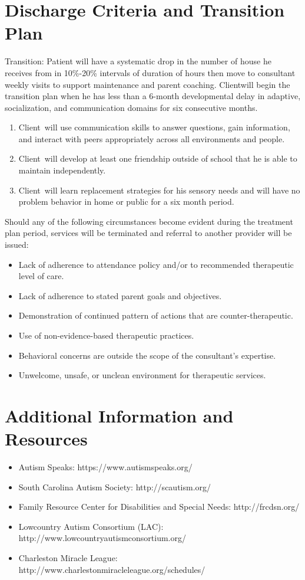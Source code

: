 \documentclass{article}
\def\clientfirstname{Client}
\begin{document}
\section{Discharge Criteria and Transition Plan}
Transition:  Patient will have a systematic drop in the number of house he receives from in 10\%-20\% intervals of duration of hours then move to consultant weekly visits to support maintenance and parent coaching. \clientfirstname will begin the transition plan when he has less than a 6-month developmental delay in adaptive, socialization, and communication domains for six consecutive months.  

	\begin{enumerate}
	\item \clientfirstname\ will use communication skills to answer questions, gain information, and interact with peers appropriately across all environments and people.
	\item \clientfirstname\ will develop at least one friendship outside of school that he is able to maintain independently.
	\item \clientfirstname\ will learn replacement strategies for his sensory needs and will have no problem behavior in home or public for a six month period.
	\end{enumerate}

Should any of the following circumstances become evident during the treatment plan period, services will be terminated and referral to another provider will be issued: 
	\begin{itemize}
	\item Lack of adherence to attendance policy and/or to recommended therapeutic level of care. 
	\item Lack of adherence to stated parent goals and objectives. 
	\item Demonstration of continued pattern of actions that are counter-therapeutic.
	\item Use of non-evidence-based therapeutic practices. 
	\item Behavioral concerns are outside the scope of the consultant’s expertise. 
	\item Unwelcome, unsafe, or unclean environment for therapeutic services. 
	\end{itemize}

\section{Additional Information and Resources}
	\begin{itemize}
	\item Autism Speaks: https://www.autismspeaks.org/ 
	\item South Carolina Autism Society: http://scautism.org/
	\item Family Resource Center for Disabilities and Special Needs: http://frcdsn.org/
	\item Lowcountry Autism Consortium (LAC): http://www.lowcountryautismconsortium.org/
	\item Charleston Miracle League: http://www.charlestonmiracleleague.org/schedules/ 
	\end{itemize}
\end{document}
